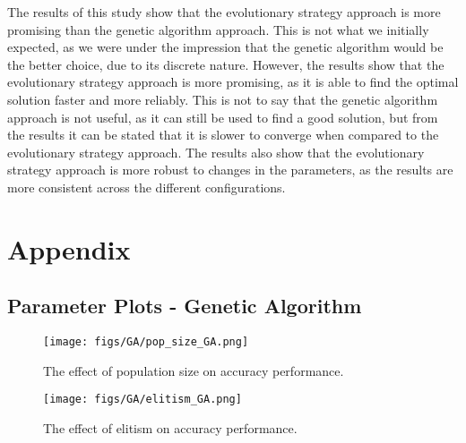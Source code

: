 \documentclass{article}
\begin{document}
The results of this study show that the evolutionary strategy approach is more promising than the genetic algorithm approach.
This is not what we initially expected, as we were under the impression that the genetic algorithm would be the better choice, due to its discrete nature.
However, the results show that the evolutionary strategy approach is more promising, as it is able to find the optimal solution faster and more reliably.
This is not to say that the genetic algorithm approach is not useful, as it can still be used to find a good solution, but from the results it can be stated that it is slower to converge when compared to the evolutionary strategy approach.
The results also show that the evolutionary strategy approach is more robust to changes in the parameters, as the results are more consistent across the different configurations.

\newpage

  
  


\newpage






\appendix
\section{Appendix}
\label{sec:app}


\subsection{Parameter Plots - Genetic Algorithm}
\label{app:params_ga}

\begin{figure*}[htbp]
    \centering
    \texttt{[image: figs/GA/pop\_size\_GA.png]}
    \caption{The effect of population size on accuracy performance.}
    \label{fig:A_GA_popsize}
\end{figure*}

\begin{figure*}[htbp]
    \centering
    \texttt{[image: figs/GA/elitism\_GA.png]}
    \caption{The effect of elitism on accuracy performance.}
    \label{fig:A_GA_elitism}
\end{figure*}
\end{document}
